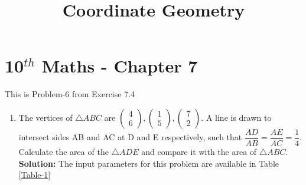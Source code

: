 \documentclass[12pt]{article}
\newcommand{\solution}{\noindent \textbf{Solution: }}
\newcommand{\myvec}[1]{\ensuremath{\begin{pmatrix}#1\end{pmatrix}}}
\begin{document}
\begin{center}
\title{\textbf{Coordinate Geometry}}
\date{\vspace{-5ex}} %
\maketitle
\end{center}
\setcounter{page}{1}
\section*{10$^{th}$ Maths - Chapter 7}
This is Problem-6 from Exercise 7.4
\begin{enumerate}
\item The vertices of $\triangle ABC$ are $\myvec{4 \\ 6}, \myvec{1\\5}, \myvec{7\\2}$. A line is drawn to intersect sides AB and AC at D and E respectively, such that $\dfrac{AD}{AB}=\dfrac{AE}{AC}=\dfrac{1}{4}$. Calculate the area of the $\triangle ADE$ and compare it with the area of $\triangle ABC$.\\
\solution The input parameters for this problem are available in Table \eqref{Table-1}
\begin{table}[ht!]\centering

\caption{}
\label{Table-1}	
\end{table}



\end{enumerate}
\end{document}
